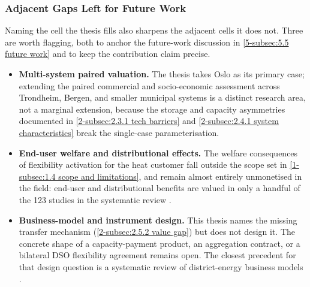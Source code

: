 \subsubsection{Adjacent Gaps Left for Future Work}
\label{2-subsec:2.6.4 future work}

Naming the cell the thesis fills also sharpens the adjacent cells it does not. Three are worth flagging, both to anchor the future-work discussion in \autoref{5-subsec:5.5 future work} and to keep the contribution claim precise.

\begin{itemize}
  \item \textbf{Multi-system paired valuation.} The thesis takes Oslo as its primary case; extending the paired commercial and socio-economic assessment across Trondheim, Bergen, and smaller municipal systems is a distinct research area, not a marginal extension, because the storage and capacity asymmetries documented in \autoref{2-subsec:2.3.1 tech barriers} and \autoref{2-subsec:2.4.1 system characteristics} break the single-case parameterisation.
  \item \textbf{End-user welfare and distributional effects.} The welfare consequences of flexibility activation for the heat customer fall outside the scope set in \autoref{1-subsec:1.4 scope and limitations}, and remain almost entirely unmonetised in the field: end-user and distributional benefits are valued in only a handful of the 123 studies in the systematic review \cite{ahmed_district_2025}.
  \item \textbf{Business-model and instrument design.} This thesis names the missing transfer mechanism (\autoref{2-subsec:2.5.2 value gap}) but does not design it. The concrete shape of a capacity-payment product, an aggregation contract, or a bilateral DSO flexibility agreement remains open. The closest precedent for that design question is a systematic review of district-energy business models \cite{selvakkumaran_how_2021}.
\end{itemize}









\newpage
